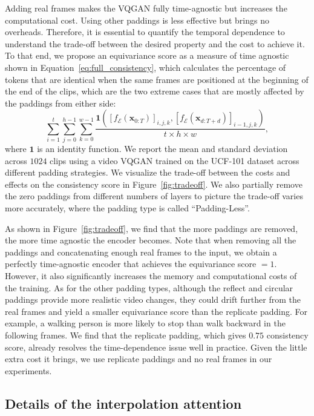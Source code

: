 Adding real frames makes the VQGAN fully time-agnostic but increases the computational cost. 
Using other paddings is less effective but brings no overheads. 
Therefore, it is essential to quantify the temporal dependence to understand the trade-off between the desired property and the cost to achieve it. 
To that end, we propose an equivariance score as a measure of time agnostic shown in Equation~\ref{eq:full_consistency}, which calculates the percentage of tokens that are identical when the same frames are positioned at the beginning of the end of the clips, which are the two extreme cases that are mostly affected by the paddings from either side:
\begin{equation}
    \sum_{i=1}^{t} \sum_{j=0}^{h-1} \sum_{k=0}^{w-1} \frac{\mathbf{1}\left([f_\mathcal{E}(\mathbf{x}_{0:T})]_{i, j, k}, [f_\mathcal{E}(\mathbf{x}_{d:T+d})]_{i-1, j, k}\right)}{t\times h\times w},
\end{equation}
where $\mathbf{1}$ is an identity function.
We report the mean and standard deviation across $1024$ clips 
using a video VQGAN trained on the UCF-101 dataset across different padding strategies. 
We visualize the trade-off between the costs and effects on the consistency score in Figure~\ref{fig:tradeoff}. 
We also partially remove the zero paddings from different numbers of layers to picture the trade-off varies more accurately, where the padding type is called ``Padding-Less''. 

As shown in Figure~\ref{fig:tradeoff}, we find that the more paddings are removed, the more time agnostic the encoder becomes. 
Note that when removing all the paddings and concatenating enough real frames to the input, we obtain a perfectly time-agnostic encoder that achieves the equivariance score $=1$. 
However, it also significantly increases the memory and computational costs of the training. 
As for the other padding types, although the reflect and circular paddings provide more realistic video changes, they could drift further from the real frames and yield a smaller equivariance score than the replicate padding. 
For example, a walking person is more likely to stop than walk backward in the following frames. We find that the replicate padding, which gives $0.75$ consistency score, already resolves the time-dependence issue well in practice. Given the little extra cost it brings, we use replicate paddings and no real frames in our experiments. 

\subsection{Details of the interpolation attention}
\label{sec:attention}


